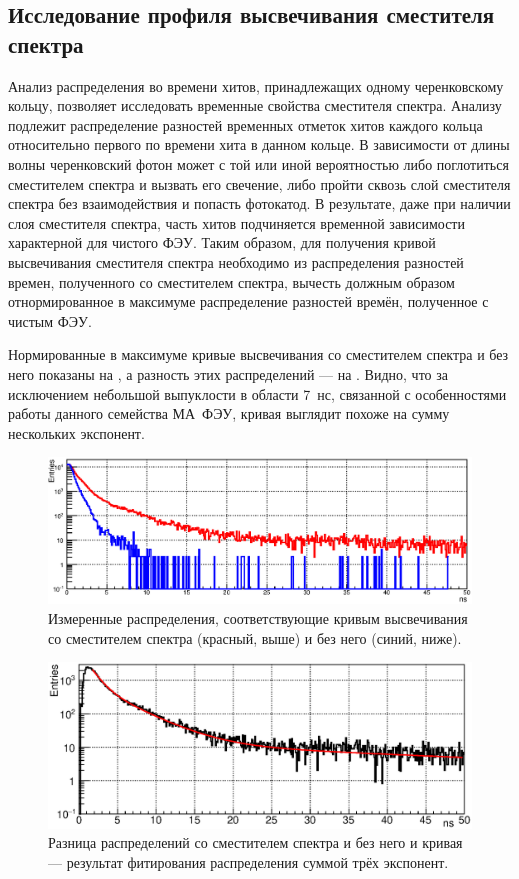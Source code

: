 \subsection{Исследование профиля высвечивания сместителя спектра}\label{section:secWLS}

Анализ распределения во времени хитов, принадлежащих одному черенковскому кольцу, позволяет исследовать временные свойства сместителя спектра. Анализу подлежит распределение разностей временных отметок хитов каждого кольца относительно первого по времени хита в данном кольце. В зависимости от длины волны черенковский фотон может с той или иной вероятностью либо поглотиться сместителем спектра и вызвать его свечение, либо пройти сквозь слой сместителя спектра без взаимодействия и попасть фотокатод. В результате, даже при наличии слоя сместителя спектра, часть хитов подчиняется временной зависимости характерной для чистого ФЭУ. Таким образом, для получения кривой высвечивания сместителя спектра необходимо из распределения разностей времен, полученного со сместителем спектра, вычесть должным образом отнормированное в максимуме распределение разностей времён, полученное с чистым ФЭУ.

Нормированные в максимуме кривые высвечивания со сместителем спектра и без него показаны на , а разность этих распределений --- на . Видно, что за исключением небольшой выпуклости в области 7~нс, связанной с особенностями работы данного семейства МА~ФЭУ, кривая выглядит похоже на сумму нескольких экспонент.

\begin{figure}[H]
\includegraphics[width=1.0\textwidth]{pictures/26_WLS.eps}
\caption{Измеренные распределения, соответствующие кривым высвечивания со сместителем спектра (красный, выше) и без него (синий, ниже).}
\label{fig:WLStwoCurves}
\end{figure}

\begin{figure}[H]
\includegraphics[width=1.0\textwidth]{pictures/27_WLSdiff_1Nov.eps}
\caption{Разница распределений со сместителем спектра и без него и кривая --- результат фитирования распределения суммой трёх экспонент.}
\label{fig:WLSdiff}
\end{figure}

